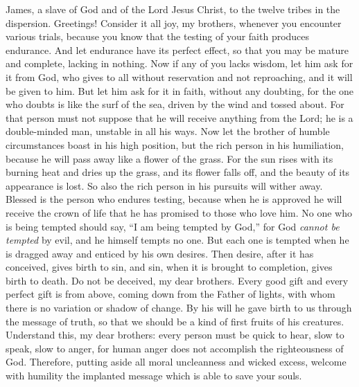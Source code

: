 
\begin{biblechapter} %
 James, a slave of God and of the Lord Jesus Christ, to the twelve tribes in the dispersion. Greetings!
 Consider it all joy, my brothers, whenever you encounter various trials,
\verse because you know that the testing of your faith produces endurance.
\verse And let endurance have its perfect effect, so that you may be mature and complete, lacking in nothing.
\verse Now if any of you lacks wisdom, let him ask for it from God, who gives to all without reservation and not reproaching, and it will be given to him.
\verse But let him ask for it in faith, without any doubting, for the one who doubts is like the surf of the sea, driven by the wind and tossed about.
\verse For that person must not suppose that he will receive anything from the Lord;
\verse he is a double-minded man, unstable in all his ways.
\verse Now let the brother of humble circumstances boast in his high position,
\verse but the rich person in his humiliation, because he will pass away like a flower of the grass.
\verse For the sun rises with its burning heat and dries up the grass, and its flower falls off, and the beauty of its appearance is lost. So also the rich person in his pursuits will wither away.
\verse Blessed is the person who endures testing, because when he is approved he will receive the crown of life that he has promised to those who love him.
\verse No one who is being tempted should say, “I am being tempted by God,” for God \textit{cannot be tempted} by evil, and he himself tempts no one.
\verse But each one is tempted when he is dragged away and enticed by his own desires.
\verse Then desire, after it has conceived, gives birth to sin, and sin, when it is brought to completion, gives birth to death.
\verse Do not be deceived, my dear brothers.
\verse Every good gift and every perfect gift is from above, coming down from the Father of lights, with whom there is no variation or shadow of change.
\verse By his will he gave birth to us through the message of truth, so that we should be a kind of first fruits of his creatures.
 Understand this, my dear brothers: every person must be quick to hear, slow to speak, slow to anger,
\verse for human anger does not accomplish the righteousness of God.
\verse Therefore, putting aside all moral uncleanness and wicked excess, welcome with humility the implanted message which is able to save your souls.

\end{biblechapter}
